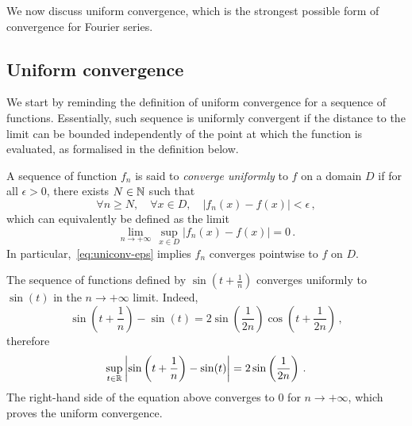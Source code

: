 We now discuss uniform convergence, which is the strongest possible form of convergence
for Fourier series.
\subsection{Uniform convergence}
We start by reminding the definition of uniform convergence for a sequence of functions.
Essentially, such sequence is uniformly convergent if the distance to the limit can be
bounded independently of the point at which the function is evaluated, as formalised in
the definition below.
\begin{definition}
	\label{def:uni-cvg}
	A sequence of function $f_n$ is said to \emph{converge uniformly} to $f$ on a domain $D$
	if for all $\epsilon>0$, there exists $N\in\mathbb{N}$ such that
	\begin{equation}
		\forall n\geq N,\quad\forall x\in
		D,\quad|f_n(x)-f(x)|<\epsilon\,,\label{eq:uniconv-eps}
	\end{equation}
	which can equivalently be defined as the limit
	\begin{equation}
		\lim_{n\to+\infty}\,\sup_{x\in D}|f_n(x)-f(x)|=0\,.
	\end{equation}
	In particular,~\cref{eq:uniconv-eps} implies $f_n$ converges pointwise to $f$ on $D$.
\end{definition}
\begin{example}
	The sequence of functions defined by $\sin(t+\frac{1}{n})$ converges uniformly to
	$\sin(t)$ in the $n\to+\infty$ limit. Indeed,
	\begin{equation}
		\sin\left(t+\frac{1}{n}\right)-\sin(t)
		=2\sin\left(\frac{1}{2n}\right)\cos\left(t+\frac{1}{2n}\right)\,,
	\end{equation}
	therefore
	\begin{equation}
		\sup_{t\in\mathbb{R}}\left|\sin\left(t+\frac{1}{n}\right)
		-\sin(t)\right|=2\sin\left(\frac{1}{2n}\right)\,.
	\end{equation}
	The right-hand side of the equation above converges to $0$ for $n\to+\infty$, which
	proves the uniform convergence.
\end{example}

